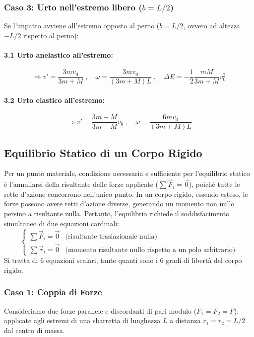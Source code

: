 \subsubsection{Caso 3: Urto nell'estremo libero ($b = L/2$)}
Se l'impatto avviene all'estremo opposto al perno ($b = L/2$, ovvero ad altezza $-L/2$ rispetto al perno):
\paragraph{3.1 Urto anelastico all'estremo:}
\begin{equation}
    \Rightarrow v' = \frac{3m v_0}{3m+M} \; , \quad \omega = \frac{3m v_0}{(3m+M)L} \; , \quad \Delta E = - \frac{1}{2} \frac{mM}{3m+M} v_0^2
\end{equation}

\paragraph{3.2 Urto elastico all'estremo:}
\begin{equation}
    \Rightarrow v' = \frac{3m-M}{3m+M} v_0 \; , \quad \omega = \frac{6m v_0}{(3m+M)L}
\end{equation}

\subsection{Equilibrio Statico di un Corpo Rigido}
Per un punto materiale, condizione necessaria e sufficiente per l'equilibrio statico è l'annullarsi della risultante delle forze applicate ($\sum \vec{F}_i = \vec{0}$), poiché tutte le rette d'azione concorrono nell'unico punto. In un corpo rigido, essendo esteso, le forze possono avere retti d'azione diverse, generando un momento non nullo persino a risultante nulla. Pertanto, l'equilibrio richiede il soddisfacimento simultaneo di due equazioni cardinali:
\begin{equation}
    \begin{cases}
        \sum \vec{F}_i = \vec{0}      & \text{(risultante traslazionale nulla)} \\[4pt]
        \sum \vec{\tau}_i = \vec{0}   & \text{(momento risultante nullo rispetto a un polo arbitrario)}
    \end{cases}
\end{equation}
Si tratta di $6$ equazioni scalari, tante quanti sono i $6$ gradi di libertà del corpo rigido.

\subsubsection{Caso 1: Coppia di Forze}
Consideriamo due forze parallele e discordanti di pari modulo ($F_1 = F_2 = F$), applicate agli estremi di una sbarretta di lunghezza $L$ a distanza $r_1 = r_2 = L/2$ dal centro di massa.

